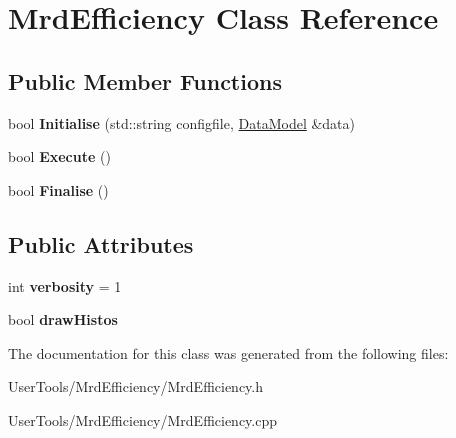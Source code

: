 \hypertarget{classMrdEfficiency}{
\section{MrdEfficiency Class Reference}
\label{classMrdEfficiency}
}
\subsection*{Public Member Functions}
\begin{DoxyCompactItemize}
\item 
\hypertarget{classMrdEfficiency_a08728f36b55f16ae22b542b41af58c30}{
bool {\bfseries Initialise} (std::string configfile, \hyperlink{classDataModel}{DataModel} \&data)}
\label{classMrdEfficiency_a08728f36b55f16ae22b542b41af58c30}

\item 
\hypertarget{classMrdEfficiency_ada02439004731e9ab80cceaf5027ac77}{
bool {\bfseries Execute} ()}
\label{classMrdEfficiency_ada02439004731e9ab80cceaf5027ac77}

\item 
\hypertarget{classMrdEfficiency_a804e18645520f7ede27d4cd7d4a0d666}{
bool {\bfseries Finalise} ()}
\label{classMrdEfficiency_a804e18645520f7ede27d4cd7d4a0d666}

\end{DoxyCompactItemize}
\subsection*{Public Attributes}
\begin{DoxyCompactItemize}
\item 
\hypertarget{classMrdEfficiency_a96c39668e71df6a3e0261bf7aeac9dcb}{
int {\bfseries verbosity} = 1}
\label{classMrdEfficiency_a96c39668e71df6a3e0261bf7aeac9dcb}

\item 
\hypertarget{classMrdEfficiency_af3a7b151047b6f71fcf1333f869c6a72}{
bool {\bfseries drawHistos}}
\label{classMrdEfficiency_af3a7b151047b6f71fcf1333f869c6a72}

\end{DoxyCompactItemize}


The documentation for this class was generated from the following files:\begin{DoxyCompactItemize}
\item 
UserTools/MrdEfficiency/MrdEfficiency.h\item 
UserTools/MrdEfficiency/MrdEfficiency.cpp\end{DoxyCompactItemize}
